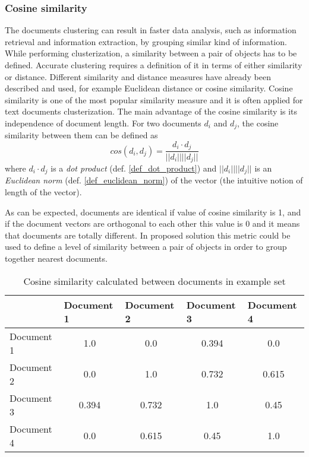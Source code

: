 \subsubsection{Cosine similarity}
 The documents clustering can result in faster data analysis, such  as  information retrieval  and  information  extraction,  by  grouping  similar kind  of  information. While performing clusterization, a similarity between a pair of objects has to be defined. Accurate clustering requires a definition of it in terms of either similarity or distance. Different similarity and distance measures have already been described and used, for example Euclidean  distance or cosine  similarity. Cosine  similarity  is  one  of  the  most  popular  similarity  measure and it is often  applied for  text  documents clusterization. The main advantage of the cosine similarity is its independence of document length. For two documents \(d_i\) and \(d_j\), the cosine similarity between them can be defined as
\[cos(d_i, d_j)=\frac{d_i \cdot d_j}{|| d_i || ||d_j ||} \]
where \(d_i \cdot d_j\) is a \textit{dot product} (def. \ref{def_dot_product}) and \(|| d_i || ||d_j ||\) is an \textit{Euclidean norm} (def. \ref{def_euclidean_norm}) of the vector (the intuitive notion of length of the vector).

As can be expected, documents are identical if value of cosine similarity is 1, and if the 
document vectors are orthogonal to each other this value is 0 and it means that documents are totally different.
In proposed solution this metric could be used to define a level of similarity between a pair of objects in order to group together nearest documents.

\begin{table}[H]
	\centering
	\caption{Cosine similarity calculated between documents in example set}
	\label{casine_similarity}
	\begin{tabular}{@{}lcccc@{}}
		\toprule
		& \multicolumn{1}{l}{Document 1} & \multicolumn{1}{l}{Document 2} & \multicolumn{1}{l}{Document 3} & \multicolumn{1}{l}{Document 4} \\ \midrule
		Document 1 & 1.0                            & 0.0                            & 0.394                          & 0.0                            \\
		Document 2 & 0.0                            & 1.0                            & 0.732                          & 0.615                          \\
		Document 3 & 0.394                          & 0.732                          & 1.0                            & 0.45                           \\
		Document 4 & 0.0                            & 0.615                          & 0.45                           & 1.0                            \\ \bottomrule
	\end{tabular}
\end{table}

